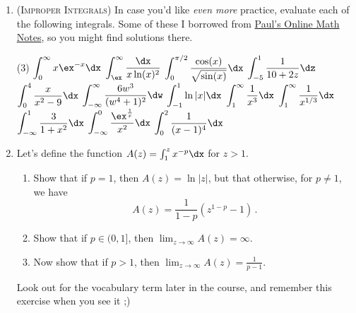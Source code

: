 \begin{enumerate}
    \item 
        (\textsc{Improper Integrals})
		In case you'd like \emph{even more} practice, 
        evaluate each of the following integrals.
        Some of these I borrowed from 
        \href{http://tutorial.math.lamar.edu/Problems/CalcII/ImproperIntegrals.aspx}%
        {Paul's Online Math Notes},
        so you might find solutions there. 
        \begin{tasks}[after-item-skip=2ex](3)
            \task $\displaystyle\int_{0}^{\infty} x\ex^{-x} \dx$
            \task $\displaystyle\int_{\ex}^{\infty} \frac{\dx}{x\ln(x)^2}$
            \task $\displaystyle\int_{0}^{\pi/2} \frac{\cos(x)}{\sqrt{\sin(x)}} \dx$
            \task $\displaystyle\int_{-5}^{1} \frac{1}{10+2z} \dz$
            \task $\displaystyle\int_{0}^{4} \frac{x}{x^2-9} \dx$
            \task $\displaystyle\int_{-\infty}^{\infty} \frac{6w^3}{(w^4+1)^2} \dw$
            \task $\displaystyle\int_{-1}^{1} \ln|x| \dx$
            \task $\displaystyle\int_{1}^{\infty} \frac{1}{x^3} \dx$
            \task $\displaystyle\int_{1}^{\infty} \frac{1}{x^{1/3}} \dx$
            \task $\displaystyle\int_{-\infty}^{1} \frac{3}{1+x^2} \dx$
            \task $\displaystyle\int_{-\infty}^{0} \frac{\ex^{\frac{1}{x}}}{x^2} \dx$
            \task $\displaystyle\int_{0}^{2} \frac{1}{(x-1)^4} \dx$
        \end{tasks}

	\item
        Let's define the function $A(z) = \int_1^z x^{-p} \dx$
        for $z>1$.
        \begin{enumerate}
        \item Show that if $p=1$, then $A(z) = \ln|z|$,
              but that otherwise, for $p\neq 1$, we have 
              \begin{equation*}
                  A(z) = \frac{1}{1-p}\left(z^{1-p}-1\right)\,.
              \end{equation*}
            \vspace{-6ex}
        \item Show that if $p \in (0,1]$,
            then $\lim_{z \to \infty} A(z) = \infty$.
        \item Now show that if $p > 1$,
            then $\lim_{z \to \infty} A(z) = \frac{1}{p-1}$.
        \end{enumerate}
		Look out for the vocabulary term  
		later in the course, and remember this exercise when you see it ;)


\end{enumerate}
